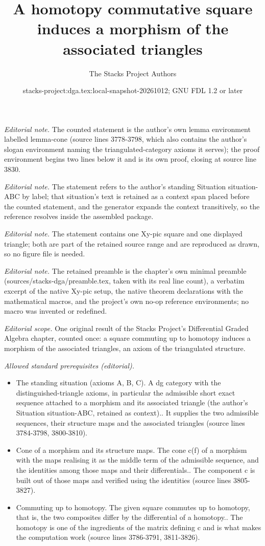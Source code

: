 \documentclass{stacks-project}
\title{A homotopy commutative square induces a morphism of the associated triangles}
\author{The Stacks Project Authors}
\date{stacks-project:dga.tex:local-snapshot-20261012; GNU FDL 1.2 or later}
\theoremstyle{plain}
\theoremstyle{definition}
\theoremstyle{remark}
\numberwithin{equation}{subsection}
\begin{document}
\maketitle
\noindent\textit{Editorial note.} The counted statement is the author's own lemma environment labelled lemma-cone (source lines 3778-3798, which also contains the author's slogan environment naming the triangulated-category axioms it serves); the proof environment begins two lines below it and is its own proof, closing at source line 3830.\par\medskip
\noindent\textit{Editorial note.} The statement refers to the author's standing Situation situation-ABC by label; that situation's text is retained as a context span placed before the counted statement, and the generator expands the context transitively, so the reference resolves inside the assembled package.\par\medskip
\noindent\textit{Editorial note.} The statement contains one Xy-pic square and one displayed triangle; both are part of the retained source range and are reproduced as drawn, so no figure file is needed.\par\medskip
\noindent\textit{Editorial note.} The retained preamble is the chapter's own minimal preamble (sources/stacks-dga/preamble.tex, taken with its real line count), a verbatim excerpt of the native Xy-pic setup, the native theorem declarations with the mathematical macros, and the project's own no-op reference environments; no macro was invented or redefined.\par\medskip
\noindent\textit{Editorial scope.} One original result of the Stacks Project's Differential Graded Algebra chapter, counted once: a square commuting up to homotopy induces a morphism of the associated triangles, an axiom of the triangulated structure.\par\medskip
\noindent\textit{Allowed standard prerequisites (editorial).}\begin{itemize}
\item The standing situation (axioms A, B, C). A dg category with the distinguished-triangle axioms, in particular the admissible short exact sequence attached to a morphism and its associated triangle (the author's Situation situation-ABC, retained as context).. It supplies the two admissible sequences, their structure maps and the associated triangles (source lines 3784-3798, 3800-3810).
\item Cone of a morphism and its structure maps. The cone c(f) of a morphism with the maps realising it as the middle term of the admissible sequence, and the identities among those maps and their differentials.. The component c is built out of those maps and verified using the identities (source lines 3805-3827).
\item Commuting up to homotopy. The given square commutes up to homotopy, that is, the two composites differ by the differential of a homotopy.. The homotopy is one of the ingredients of the matrix defining c and is what makes the computation work (source lines 3786-3791, 3811-3826).
\end{itemize}\medskip
\end{document}
